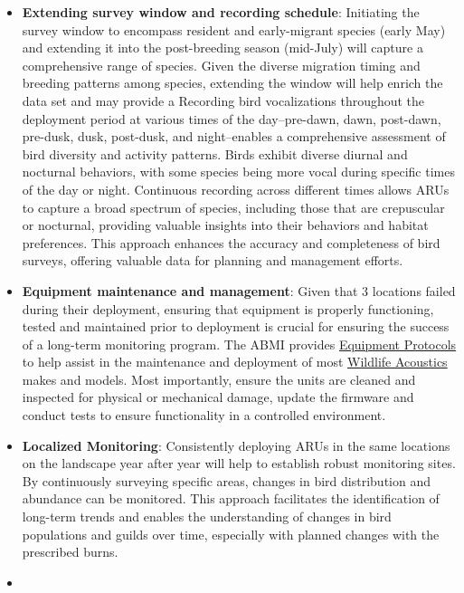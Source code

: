 \documentclass[
  letterpaper,
  DIV=11,
  numbers=noendperiod,
  oneside]{scrartcl}
\begin{document}
\begin{itemize}
\item
  \textbf{Extending survey window and recording schedule}: Initiating
  the survey window to encompass resident and early-migrant species
  (early May) and extending it into the post-breeding season (mid-July)
  will capture a comprehensive range of species. Given the diverse
  migration timing and breeding patterns among species, extending the
  window will help enrich the data set and may provide a Recording bird
  vocalizations throughout the deployment period at various times of the
  day--pre-dawn, dawn, post-dawn, pre-dusk, dusk, post-dusk, and
  night--enables a comprehensive assessment of bird diversity and
  activity patterns. Birds exhibit diverse diurnal and nocturnal
  behaviors, with some species being more vocal during specific times of
  the day or night. Continuous recording across different times allows
  ARUs to capture a broad spectrum of species, including those that are
  crepuscular or nocturnal, providing valuable insights into their
  behaviors and habitat preferences. This approach enhances the accuracy
  and completeness of bird surveys, offering valuable data for planning
  and management efforts.
\item
  \textbf{Equipment maintenance and management}: Given that 3 locations
  failed during their deployment, ensuring that equipment is properly
  functioning, tested and maintained prior to deployment is crucial for
  ensuring the success of a long-term monitoring program. The ABMI
  provides
  \href{https://ftp-public.abmi.ca/home/publications/documents/599_ABMI_2021_TerrestrialARUandRemoteCameraTrapProtocols_ABMI.pdf}{Equipment
  Protocols} to help assist in the maintenance and deployment of most
  \href{https://www.wildlifeacoustics.com/}{Wildlife Acoustics} makes
  and models. Most importantly, ensure the units are cleaned and
  inspected for physical or mechanical damage, update the firmware and
  conduct tests to ensure functionality in a controlled environment.
\item
  \textbf{Localized Monitoring}: Consistently deploying ARUs in the same
  locations on the landscape year after year will help to establish
  robust monitoring sites. By continuously surveying specific areas,
  changes in bird distribution and abundance can be monitored. This
  approach facilitates the identification of long-term trends and
  enables the understanding of changes in bird populations and guilds
  over time, especially with planned changes with the prescribed burns.
\item

\end{itemize}
\end{document}
